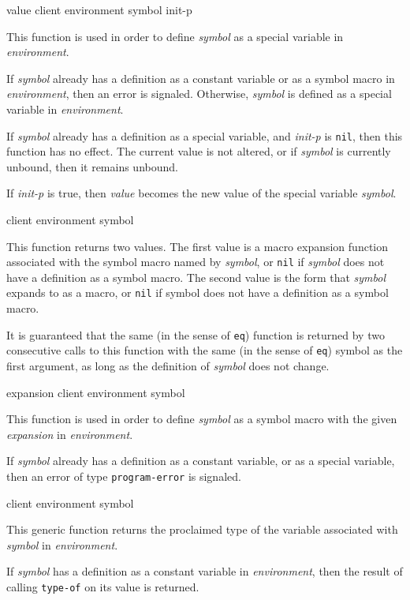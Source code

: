  {value client environment symbol init-p}

This function is used in order to define \textit{symbol} as a special
variable in \textit{environment}.

If \textit{symbol} already has a definition as a constant variable or
as a symbol macro in \textit{environment}, then an error is signaled.
Otherwise, \textit{symbol} is defined as a special variable in
\textit{environment}.

If \textit{symbol} already has a definition as a special variable, and
\textit{init-p} is \texttt{nil}, then this function has no effect.
The current value is not altered, or if \textit{symbol} is currently
unbound, then it remains unbound.

If \textit{init-p} is true, then \textit{value} becomes the new value
of the special variable \textit{symbol}.

 {client environment symbol}

This function returns two values.  The first value is a macro
expansion function associated with the symbol macro named by
\textit{symbol}, or \texttt{nil} if \textit{symbol} does not have a
definition as a symbol macro.  The second value is the form that
\textit{symbol} expands to as a macro, or \texttt{nil} if symbol does
not have a definition as a symbol macro.

It is guaranteed that the same (in the sense of \texttt{eq}) function
is returned by two consecutive calls to this function with the same
(in the sense of \texttt{eq})
symbol as the first argument, as long as the definition of
\textit{symbol} does not change.

 {expansion client environment symbol}

This function is used in order to define \textit{symbol} as a symbol
macro with the given \textit{expansion} in \textit{environment}.

If \textit{symbol} already has a definition as a constant variable, or
as a special variable, then an error of type \texttt{program-error} is
signaled.

 {client environment symbol}

This generic function returns the proclaimed type of the variable
associated with \textit{symbol} in \textit{environment}.

If \textit{symbol} has a definition as a constant variable in
\textit{environment}, then the result of calling \texttt{type-of} on
its value is returned.

